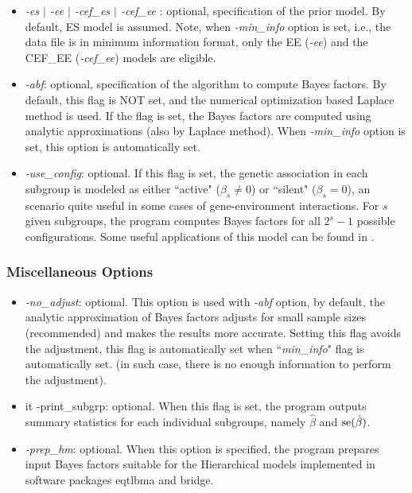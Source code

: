 \documentclass[11pt,fleqn]{article}
\begin{document}
\begin{itemize}
  \item {\it -es $|$ -ee $|$ -cef\_es $|$ -cef\_ee }: optional, specification of the prior model. By default, ES model is assumed. Note, when {\it -min\_info} option is set, i.e., the data file is in minimum information format, only the EE ({\it -ee}) and the CEF\_EE ({\it -cef\_ee}) models are eligible. 
  
 \item {\it -abf}: optional, specification of the algorithm to compute Bayes factors. By default, this flag is NOT set, and the numerical optimization based Laplace method is used. If the flag is set, the Bayes factors are computed using analytic approximations (also by Laplace method). When {\it -min\_info} option is set, this option is automatically set. 
  
 \item {\it -use\_config}: optional.  If this flag is set, the genetic association in each subgroup is modeled as either ``active" ($\beta_s \ne 0$) or ``silent" ($\beta_s = 0$), an scenario quite useful in some cases of gene-environment interactions. For $s$ given subgroups, the program computes Bayes factors for all $2^s - 1$ possible configurations. Some useful applications of this model can be found in \cite{Wen2012, Flutre2012}. 
    
  
\end{itemize}
 
\subsubsection{Miscellaneous Options}
 
\begin{itemize}
  \item {\it -no\_adjust}: optional. This option is used with {\it -abf} option, by default, the analytic approximation of Bayes factors adjusts for small sample sizes (recommended) and makes the results more accurate. Setting this flag avoids the adjustment, this flag is automatically set when ``{\it min\_info}" flag is automatically set. (in such case, there is no enough information to perform the adjustment). 
  \item {it -print\_subgrp}: optional. When this flag is set, the program outputs summary statistics for each individual subgroups, namely $\hat \beta$ and ${\rm se}(\hat \beta)$. 
  \item {\it -prep\_hm}: optional. When this option is specified, the program prepares input Bayes factors suitable for the Hierarchical models implemented in software packages eqtlbma and bridge.  
\end{itemize} 
\end{document}
